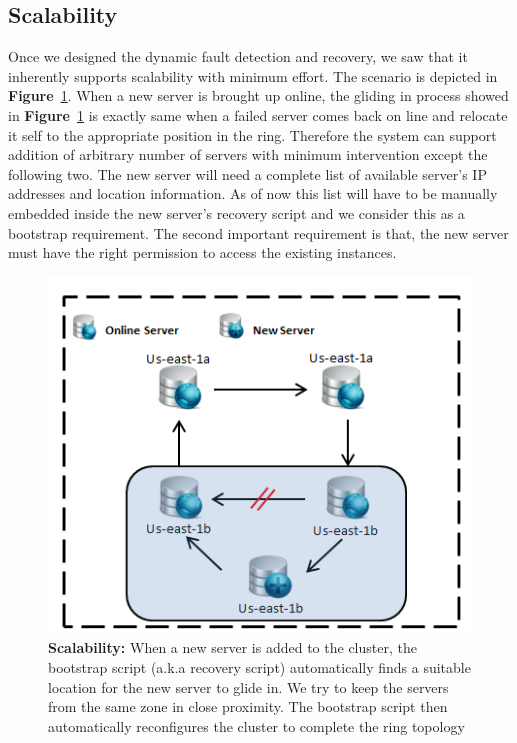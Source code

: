 \documentclass[12pt]{article}
\begin{document}
\subsection{Scalability}
\label{scalability} 
Once we designed the dynamic fault detection and recovery, we saw
that it inherently supports scalability with minimum effort. The scenario is
depicted in \textbf{Figure}~\ref{fig:scalability}. When a new server is brought
up online, the gliding in process showed in \textbf{Figure}~\ref{fig:scalability}  is exactly same when a failed server comes back on line
and relocate it self to the appropriate position in the ring. Therefore the
system can support addition of arbitrary number of servers with minimum
intervention except the following two. The new server will need a complete list
of available server's IP addresses and location information. As of now this list
will have to be manually embedded inside the new server's recovery script and we
consider this as a bootstrap requirement. The second important requirement is
that, the new server must have the right permission to access the existing
instances.  
\begin{figure}[H] 
\centering
\includegraphics[scale=0.8]{Images/figure3.PNG} 
\caption{\textbf{Scalability:}
When a new server is added to the cluster, the bootstrap script (a.k.a recovery
script) automatically finds a suitable location for the new server to glide in.
We try to keep the servers from the same zone in close proximity. The bootstrap
script then automatically reconfigures the cluster to complete the ring topology
} 
\label{fig:scalability} 
\end{figure}
\end{document}
